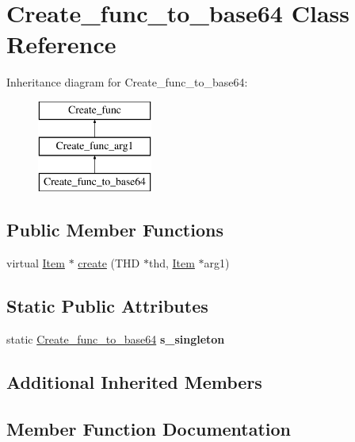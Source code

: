 \hypertarget{classCreate__func__to__base64}{}\section{Create\+\_\+func\+\_\+to\+\_\+base64 Class Reference}
\label{classCreate__func__to__base64}
Inheritance diagram for Create\+\_\+func\+\_\+to\+\_\+base64\+:\begin{figure}[H]
\begin{center}
\leavevmode
\includegraphics[height=3.000000cm]{classCreate__func__to__base64}
\end{center}
\end{figure}
\subsection*{Public Member Functions}
\begin{DoxyCompactItemize}
\item 
virtual \mbox{\hyperlink{classItem}{Item}} $\ast$ \mbox{\hyperlink{classCreate__func__to__base64_ae916ad1fcb2631e51a03efa07811237f}{create}} (T\+HD $\ast$thd, \mbox{\hyperlink{classItem}{Item}} $\ast$arg1)
\end{DoxyCompactItemize}
\subsection*{Static Public Attributes}
\begin{DoxyCompactItemize}
\item 
\mbox{\label{classCreate__func__to__base64_af9bb750848c41921fb60f69bad4a7ca1}} 
static \mbox{\hyperlink{classCreate__func__to__base64}{Create\+\_\+func\+\_\+to\+\_\+base64}} {\bfseries s\+\_\+singleton}
\end{DoxyCompactItemize}
\subsection*{Additional Inherited Members}


\subsection{Member Function Documentation}
\mbox{\label{classCreate__func__to__base64_ae916ad1fcb2631e51a03efa07811237f}} 
